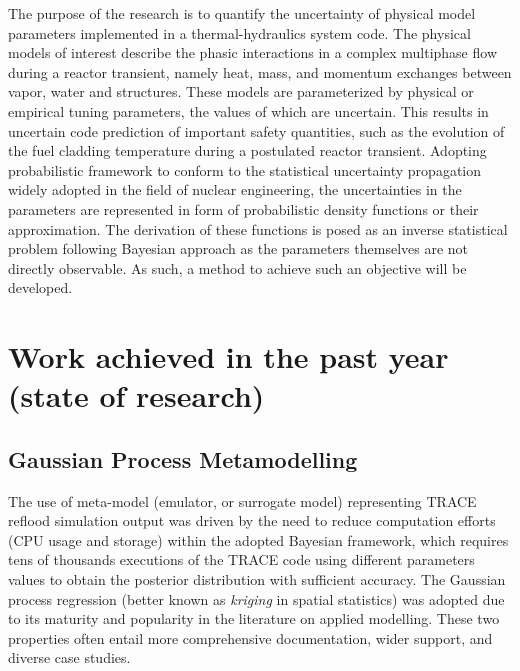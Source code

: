 \documentclass[11pt,titlepage]{article}
\begin{document}
The purpose of the research is to quantify the uncertainty of 
physical model parameters implemented in a thermal-hydraulics system code. 
The physical models of interest describe the phasic interactions in a complex 
multiphase flow during a reactor transient, namely heat, mass, and momentum 
exchanges between vapor, water and structures. 
These models are parameterized 
by physical or empirical tuning parameters, the values of which are uncertain. 
This results in uncertain code prediction of important safety quantities, such 
as the evolution of the fuel cladding temperature during a postulated reactor 
transient.
Adopting probabilistic framework to conform to the statistical uncertainty 
propagation widely adopted in the field of nuclear engineering, 
the uncertainties in the parameters are represented in form of probabilistic 
density functions or their approximation. The derivation of these functions 
is posed as an inverse statistical problem following Bayesian approach as 
the parameters themselves are not directly observable. 
As such, a method to achieve such an objective will be developed.

\section{Work achieved in the past year (state of research)}

\subsection{Gaussian Process Metamodelling}

The use of meta-model (emulator, or surrogate model) representing TRACE reflood
simulation output was driven by the need to reduce computation efforts 
(CPU usage and storage) within the adopted Bayesian framework, which requires 
tens of thousands executions of the TRACE code using different parameters 
values to obtain the posterior distribution with sufficient accuracy. 
The Gaussian process regression (better known as \emph{kriging} in spatial 
statistics) was adopted due to its maturity and popularity in the literature 
on applied modelling. These two properties often entail more comprehensive 
documentation, wider support, and diverse case studies.
\end{document}
